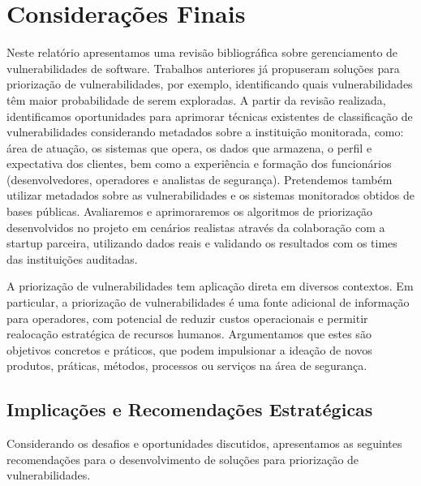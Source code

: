 
\section{Considerações Finais}

Neste relatório apresentamos uma revisão bibliográfica sobre gerenciamento de vulnerabilidades de software.  Trabalhos anteriores já propuseram soluções para priorização de vulnerabilidades, por exemplo, identificando quais vulnerabilidades têm maior probabilidade de serem exploradas. A partir da revisão realizada, identificamos oportunidades para aprimorar técnicas existentes de classificação de vulnerabilidades considerando metadados sobre a instituição monitorada, como: área de atuação, os sistemas que opera, os dados que armazena, o perfil e expectativa dos clientes, bem como a experiência e formação dos funcionários (desenvolvedores, operadores e analistas de segurança). Pretendemos também utilizar metadados sobre as vulnerabilidades e os sistemas monitorados obtidos de bases públicas. Avaliaremos e aprimoraremos os algoritmos de priorização desenvolvidos no projeto em cenários realistas através da colaboração com a startup parceira, utilizando dados reais e validando os resultados com os times das instituições auditadas.

A priorização de vulnerabilidades tem aplicação direta em diversos contextos. Em particular, a priorização de vulnerabilidades é uma fonte adicional de informação para operadores, com potencial de reduzir custos operacionais e permitir realocação estratégica de recursos humanos.  Argumentamos que estes são objetivos concretos e práticos, que podem impulsionar a ideação de novos produtos, práticas, métodos, processos ou serviços na área de segurança.

\subsection{Implicações e Recomendações Estratégicas}

Considerando os desafios e oportunidades discutidos, apresentamos as seguintes recomendações para o desenvolvimento de soluções para priorização de vulnerabilidades.

